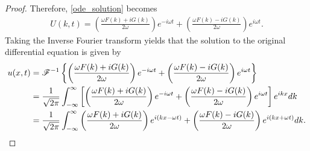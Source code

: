 \begin{proof}
  Therefore, \eqref{ode_solution} becomes
  \begin{align*}
    U(k, t) = \left(\frac{\omega F(k) + i G(k)}{2\omega}\right)e^{-i\omega t} + \left(\frac{\omega F(k) - i G(k)}{2\omega}\right)e^{i\omega t}.
  \end{align*}
  Taking the Inverse Fourier transform yields that the solution to the original differential equation is given by
  \begin{align*}
    u(x, t) &= \mathscr{F}^{-1}\left\{ {\left(\frac{\omega F(k) + i G(k)}{2\omega}\right)e^{-i\omega t} + \left(\frac{\omega F(k) - i G(k)}{2\omega}\right)e^{i\omega t}} \right\} \\
    &= \frac{1}{\sqrt{2\pi}}\int_{-\infty}^\infty \left[\left(\frac{\omega F(k) + i G(k)}{2\omega}\right)e^{-i\omega t} + \left(\frac{\omega F(k) - i G(k)}{2\omega}\right)e^{i\omega t}\right] e^{ikx} dk \\
    &= \frac{1}{\sqrt{2\pi}}\int_{-\infty}^\infty \left(\frac{\omega F(k) + i G(k)}{2\omega}\right)e^{i(kx-\omega t)} + \left(\frac{\omega F(k) - i G(k)}{2\omega}\right)e^{i(kx + \omega t)}dk.
  \end{align*}

\end{proof}
\newpage
